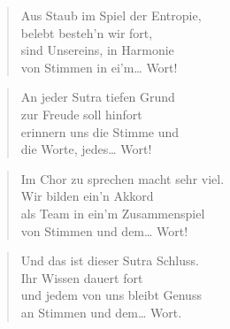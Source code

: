 \documentclass[10pt,a4paper]{article}
\begin{document}
\begin{multicols}{2}
\begin{verse}
Aus Staub im Spiel der Entropie, \\
belebt besteh’n wir fort, \\
sind Unsereins, in Harmonie \\
von Stimmen in ei’m… Wort! \\
\end{verse}

\begin{verse}
An jeder Sutra tiefen Grund \\
zur Freude soll hinfort \\
erinnern uns die Stimme und \\
die Worte, jedes… Wort! \\
\end{verse}

\begin{verse}
Im Chor zu sprechen macht sehr viel. \\
Wir bilden ein’n Akkord \\
als Team in ein’m Zusammenspiel \\
von Stimmen und dem… Wort! \\
\end{verse}

\begin{verse}
Und das ist dieser Sutra Schluss. \\
Ihr Wissen dauert fort \\
und jedem von uns bleibt Genuss \\
an Stimmen und dem… Wort. \\
\end{verse}

\end{multicols}
\end{document}
